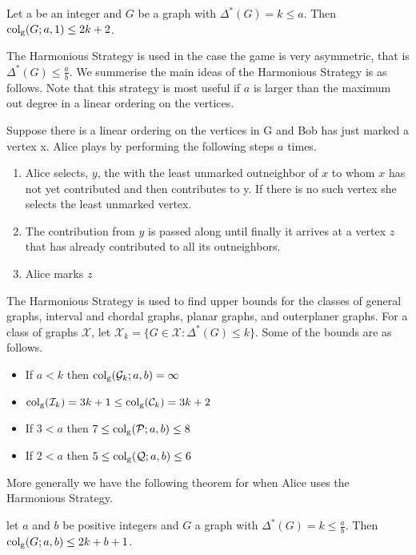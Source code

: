\begin{theorem}\label{thm:kiYa2005}
    Let a be an integer and $G$ be a graph with $\Delta^*(G) = k\leq a$. Then
    $\operatorname{col_g}(G;a,1) \leq 2k + 2$.
\end{theorem}

The Harmonious Strategy is used in the case the game is very asymmetric, that is $\Delta^*(G)\leq \frac{a}{b}$. We summerise the main ideas of the Harmonious Strategy is as follows. Note that this strategy is most useful if $a$ is larger than the maximum out degree in a linear ordering on the vertices.

Suppose there is a linear ordering on the vertices in G and Bob has just marked a vertex x. Alice plays by performing the following steps $a$ times.    
\begin{enumerate}
    \item  Alice selects, $y$, the with the least unmarked outneighbor of $x$ to whom $x$ has not yet contributed and then contributes to y. If there is no such vertex she selects the least unmarked vertex.
    \item  The contribution from $y$
    is passed along until finally it arrives at a vertex $z$ that has already contributed to all its outneighbors.
    \item  Alice marks $z$
\end{enumerate}

The Harmonious Strategy is used to find upper bounds for the classes of general graphs, interval and chordal graphs, planar graphs, and outerplaner graphs. For a class of graphs $\mathcal{X}$, let $\mathcal{X}_k= \{G\in\mathcal{X}: \Delta^*(G)\leq k\}$. Some of the bounds are as follows.    
\begin{itemize}
    \item If $a < k$ then $\operatorname{col_g}(\mathcal{G}_k;a,b)=\infty$
    \item $\operatorname{col_g}(\mathcal{I}_k)=3k+1\leq\operatorname{col_g}(\mathcal{C}_k)=3k+2$
    \item If $3<a $ then $7\leq \operatorname{col_g}(\mathcal{P};a,b)\leq 8$
    \item If $2< a$ then $5\leq \operatorname{col_g}(\mathcal{Q};a,b)\leq 6$
\end{itemize}
More generally we have the following theorem for when Alice uses the Harmonious Strategy.
\begin{theorem}
    let $a$ and $b$ be positive integers and $G$ a graph with $\Delta^*(G)=k\leq\frac{a}{b}$. Then $\operatorname{col_g}(G;a,b)\leq 2k+b+1$.
\end{theorem}

